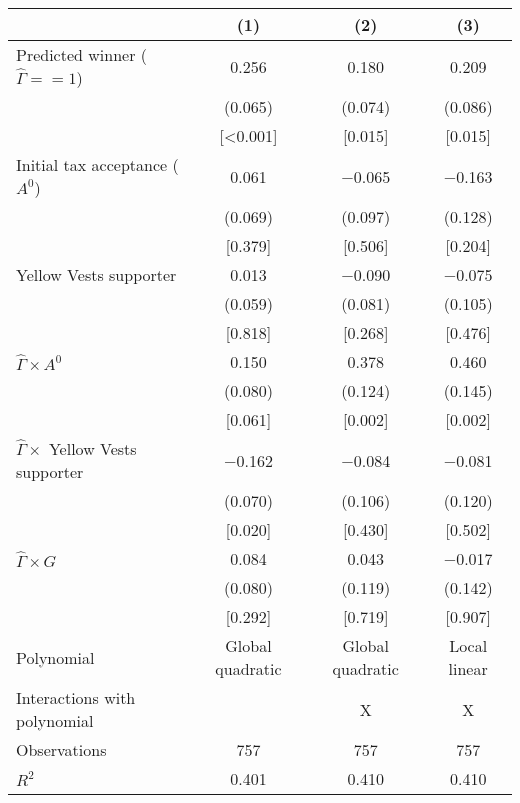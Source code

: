 
\begin{tabular}[t]{lccc}
\toprule
  & (1) & (2) & (3)\\
\midrule
Predicted winner ($\hat{\Gamma} == 1$) & \num{0.256} & \num{0.180} & \num{0.209}\\
 & (\num{0.065}) & (\num{0.074}) & (\num{0.086})\\
 & {}[\num{<0.001}] & {}[\num{0.015}] & {}[\num{0.015}]\\
Initial tax acceptance ($A^0$) & \num{0.061} & \num{-0.065} & \num{-0.163}\\
 & (\num{0.069}) & (\num{0.097}) & (\num{0.128})\\
 & {}[\num{0.379}] & {}[\num{0.506}] & {}[\num{0.204}]\\
Yellow Vests supporter & \num{0.013} & \num{-0.090} & \num{-0.075}\\
 & (\num{0.059}) & (\num{0.081}) & (\num{0.105})\\
 & {}[\num{0.818}] & {}[\num{0.268}] & {}[\num{0.476}]\\
$\hat{\Gamma} \times A^0$ & \num{0.150} & \num{0.378} & \num{0.460}\\
 & (\num{0.080}) & (\num{0.124}) & (\num{0.145})\\
 & {}[\num{0.061}] & {}[\num{0.002}] & {}[\num{0.002}]\\
$\hat{\Gamma} \times $ Yellow Vests supporter & \num{-0.162} & \num{-0.084} & \num{-0.081}\\
 & (\num{0.070}) & (\num{0.106}) & (\num{0.120})\\
 & {}[\num{0.020}] & {}[\num{0.430}] & {}[\num{0.502}]\\
$\hat{\Gamma} \times G$ & \num{0.084} & \num{0.043} & \num{-0.017}\\
 & (\num{0.080}) & (\num{0.119}) & (\num{0.142})\\
 & {}[\num{0.292}] & {}[\num{0.719}] & {}[\num{0.907}]\\
\midrule
Polynomial & Global quadratic & Global quadratic & Local linear\\
Interactions with polynomial &  & X & X\\
Observations & \num{757} & \num{757} & \num{757}\\
$R^2$ & \num{0.401} & \num{0.410} & \num{0.410}\\
\bottomrule
\end{tabular}
